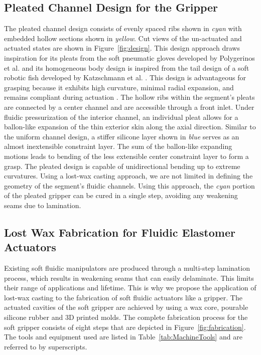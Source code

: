 \subsection{Pleated Channel Design for the Gripper}
The pleated channel design consists of evenly spaced ribs shown in \emph{cyan} with embedded hollow sections shown in \emph{yellow}.
Cut views of the un-actuated and actuated states are shown in Figure~\ref{fig:design}.
This design approach draws inspiration for its pleats from the soft pneumatic gloves developed by Polygerinos et al. \cite{polygerinos2013towards} and its homogeneous body design is inspired from the tail design of a soft robotic fish developed by Katzschmann et al. \cite{katzschmann2014hydraulic}.
This design is advantageous for grasping because it exhibits high curvature, minimal radial expansion, and remains compliant during actuation \cite{marchese2015recipe}. 
The hollow ribs within the segment's pleats are connected by a center channel and are accessible through a front inlet.
Under fluidic pressurization of the interior channel, an individual pleat allows for a ballon-like expansion of the thin exterior skin along the axial direction.
Similar to the uniform channel design, a stiffer silicone layer shown in \emph{blue} serves as an almost inextensible constraint layer.
The sum of the ballon-like expanding motions leads to bending of the less extensible center constraint layer to form a grasp.
The pleated design is capable of unidirectional bending up to extreme curvatures.
Using a lost-wax casting approach, we are not limited in defining the geometry of the segment's fluidic channels.
Using this approach, the \emph{cyan} portion of the pleated gripper can be cured in a single step, avoiding any weakening seams due to lamination.

\subsection{Lost Wax Fabrication for Fluidic Elastomer Actuators}
Existing soft fluidic manipulators are produced through a multi-step lamination process, which results in weakening seams that can easily delaminate. 
This limits their range of applications and lifetime.
This is why we propose the application of lost-wax casting to the fabrication of soft fluidic actuators like a gripper.
The actuated cavities of the soft gripper are achieved by using a wax core, pourable silicone rubber and 3D printed molds.
The complete fabrication process for the soft gripper consists of eight steps that are depicted in Figure~\ref{fig:fabrication}.
The tools and equipment used are listed in Table~\ref{tab:MachineTools} and are referred to by superscripts.

